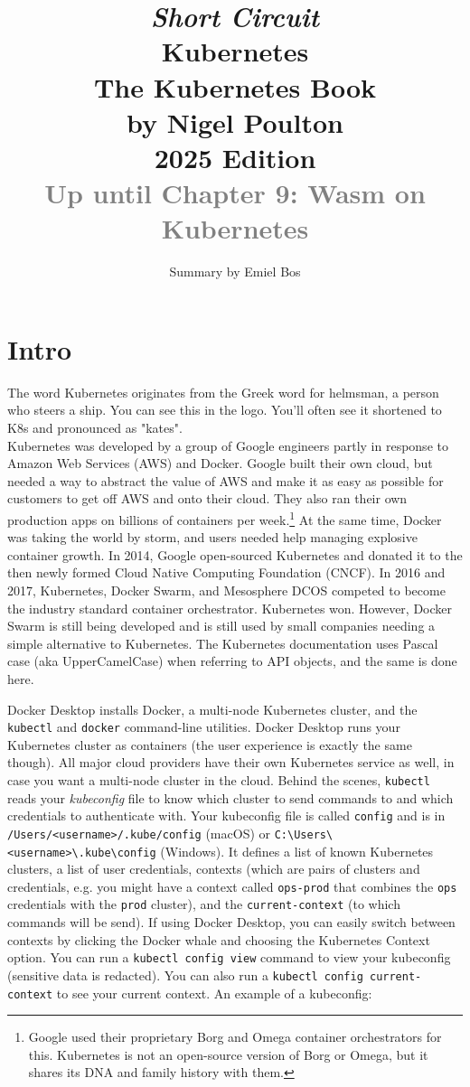 \documentclass[8pt, table, xcdraw]{article}%
\title{
\textit{Short Circuit}\\
\vspace{15px}
\huge
Kubernetes\\
\vspace{20px}
\large
The Kubernetes Book\\
by Nigel Poulton\\
2025 Edition\\
\textcolor{gray}{Up until Chapter 9: Wasm on Kubernetes}
}
\author{Summary by Emiel Bos}
\date{}
\begin{document}
\maketitle

\section{Intro}

The word Kubernetes originates from the Greek word for helmsman, a person who steers a ship. You can see this in the logo. You’ll often see it shortened to K8s and pronounced as "kates".\\
Kubernetes was developed by a group of Google engineers partly in response to Amazon Web Services (AWS) and Docker. Google built their own cloud, but needed a way to abstract the value of AWS and make it as easy as possible for customers to get off AWS and onto their cloud. They also ran their own production apps on billions of containers per week.\footnote{Google used their proprietary Borg and Omega container orchestrators for this. Kubernetes is not an open-source version of Borg or Omega, but it shares its DNA and family history with them.} At the same time, Docker was taking the world by storm, and users needed help managing explosive container growth. In 2014, Google open-sourced Kubernetes and donated it to the then newly formed Cloud Native Computing Foundation (CNCF).
In 2016 and 2017, Kubernetes, Docker Swarm, and Mesosphere DCOS competed to become the industry standard container orchestrator. Kubernetes won. However, Docker Swarm is still being developed and is still used by small companies needing a simple alternative to Kubernetes.
The Kubernetes documentation uses Pascal case (aka UpperCamelCase) when referring to API objects, and the same is done here.

Docker Desktop installs Docker, a multi-node Kubernetes cluster, and the \lstinline{kubectl} and \lstinline{docker} command-line utilities. Docker Desktop runs your Kubernetes cluster as containers (the user experience is exactly the same though). All major cloud providers have their own Kubernetes service as well, in case you want a multi-node cluster in the cloud. Behind the scenes, \lstinline{kubectl} reads your \emph{kubeconfig} file to know which cluster to send commands to and which credentials to authenticate with. Your kubeconfig file is called \lstinline{config} and is in \lstinline{/Users/<username>/.kube/config} (macOS) or \lstinline{C:\Users\<username>\.kube\config} (Windows). It defines a list of known Kubernetes clusters, a list of user credentials, contexts (which are pairs of clusters and credentials, e.g. you might have a context called \lstinline{ops-prod} that combines the \lstinline{ops} credentials with the \lstinline{prod} cluster), and the \lstinline{current-context}  (to which commands will be send). If using Docker Desktop, you can easily switch between contexts by clicking the
Docker whale and choosing the Kubernetes Context option. You can run a \lstinline{kubectl config view} command to view your kubeconfig (sensitive data is redacted). You can also run a \lstinline{kubectl config current-context} to see your current context. An example of a kubeconfig:
\end{document}
